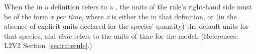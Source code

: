 When the  in a \RateRule definition refers to a \Species,
the units of the rule's right-hand side must be of the form \emph{x per
time}, where \emph{x} is either the  in that \Species
definition, or (in the absence of explicit units declared for the species'
quantity) the default units for that species, and \emph{time} refers to the
units of time for the model.  (References: L2V2
Section~\ref{sec:raterule}.)
